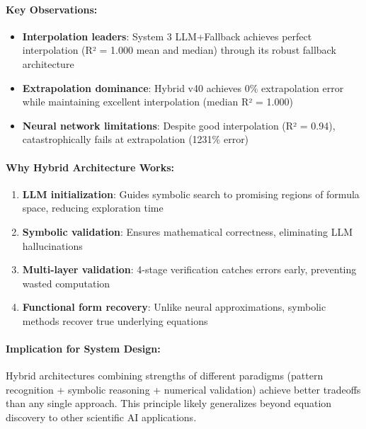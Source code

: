 \paragraph{Key Observations:}

\begin{itemize}
    \item \textbf{Interpolation leaders}: System 3 LLM+Fallback achieves perfect interpolation (R² = 1.000 mean and median) through its robust fallback architecture

    \item \textbf{Extrapolation dominance}: Hybrid v40 achieves 0\% extrapolation error while maintaining excellent interpolation (median R² = 1.000)

    \item \textbf{Neural network limitations}: Despite good interpolation (R² = 0.94), catastrophically fails at extrapolation (1231\% error)
\end{itemize}

\paragraph{Why Hybrid Architecture Works:}

\begin{enumerate}
    \item \textbf{LLM initialization}: Guides symbolic search to promising regions of formula space, reducing exploration time
    \item \textbf{Symbolic validation}: Ensures mathematical correctness, eliminating LLM hallucinations
    \item \textbf{Multi-layer validation}: 4-stage verification catches errors early, preventing wasted computation
    \item \textbf{Functional form recovery}: Unlike neural approximations, symbolic methods recover true underlying equations
\end{enumerate}

\paragraph{Implication for System Design:}

Hybrid architectures combining strengths of different paradigms (pattern recognition + symbolic reasoning + numerical validation) achieve better tradeoffs than any single approach. This principle likely generalizes beyond equation discovery to other scientific AI applications.

